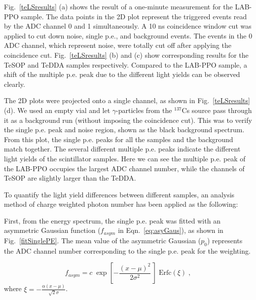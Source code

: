 Fig.~\ref{teLSresults} (a) shows the result of a one-minute measurement for the LAB-PPO sample. The data points in the 2D plot represent the triggered events read by the ADC channel 0 and 1 simultaneously. A 10 ns coincidence window cut was applied to cut down noise, single p.e., and background events. The events in the 0 ADC channel, which represent noise, were totally cut off after applying the coincidence cut. Fig.~\ref{teLSresults} (b) and (c) show corresponding results for the TeSOP and TeDDA samples respectively. Compared to the LAB-PPO sample, a shift of the multiple p.e. peak due to the different light yields can be observed clearly. %

The 2D plots were projected onto a single channel, as shown in Fig.~\ref{teLSresults} (d). We used an empty vial and let $\gamma$-particles from the $^{137}$Cs source pass through it as a background run (without imposing the coincidence cut). This was to verify the single p.e. peak and noise region, shown as the black background spectrum. From this plot, the single p.e. peaks for all the samples and the background match together. The several different multiple p.e. peaks indicate the different light yields of the scintillator samples. Here we can see the multiple p.e. peak of the LAB-PPO occupies the largest ADC channel number, while the channels of TeSOP are slightly larger than the TeDDA. 


To quantify the light yield differences between different samples, an analysis method of charge weighted photon number has been applied as the following:

First, from the energy spectrum, the single p.e. peak was fitted with an asymmetric Gaussian function ($f_{asym}$ in Eqn.~\ref{eq:asyGaus}), as shown in Fig.~\ref{fitSinglePE}. The mean value of the asymmetric Gaussian ($p_0$) represents the ADC channel number corresponding to the single p.e. peak for the weighting. 

\begin{equation}\label{eq:asyGaus}
f_{asym}=c \; \exp\left[- \frac{(x-\mu)^2}{2 \sigma^2} \, \right] \; \mathrm{Erfc}(\xi)\; ,
\end{equation}
where $\xi=-\frac{\alpha(x-\mu)}{\sqrt 2\sigma}$.

